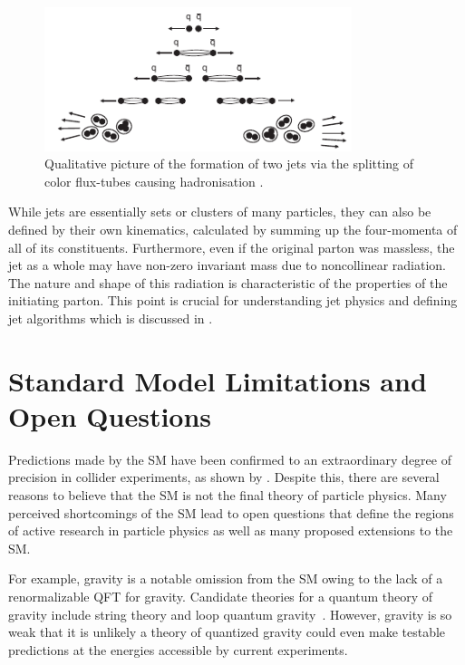 \begin{figure}[h]
	\centering
	\includegraphics[width=0.8\textwidth]{Figures/standard_model/hadronisation.pdf}
	\caption{Qualitative picture of the formation of two jets via the splitting of color flux-tubes causing hadronisation \cite{ModernParticlePhysics}.}
	\label{fig:hadronisation}
\end{figure}

While jets are essentially sets or clusters of many particles, they can also be defined by their own kinematics, calculated by summing up the four-momenta of all of its constituents.
Furthermore, even if the original parton was massless, the jet as a whole may have non-zero invariant mass due to noncollinear radiation.
The nature and shape of this radiation is characteristic of the properties of the initiating parton.
This point is crucial for understanding jet physics and defining jet algorithms which is discussed in .

\section{Standard Model Limitations and Open Questions}
\label{sec:sm_limitations}

Predictions made by the SM have been confirmed to an extraordinary degree of precision in collider experiments, as shown by .
Despite this, there are several reasons to believe that the SM is not the final theory of particle physics.
Many perceived shortcomings of the SM lead to open questions that define the regions of active research in particle physics as well as many proposed extensions to the SM\@.

For example, gravity is a notable omission from the SM owing to the lack of a renormalizable QFT for gravity.
Candidate theories for a quantum theory of gravity include string theory and loop quantum gravity~\cite{GravityQFT}.
However, gravity is so weak that it is unlikely a theory of quantized gravity could even make testable predictions at the energies accessible by current experiments.

